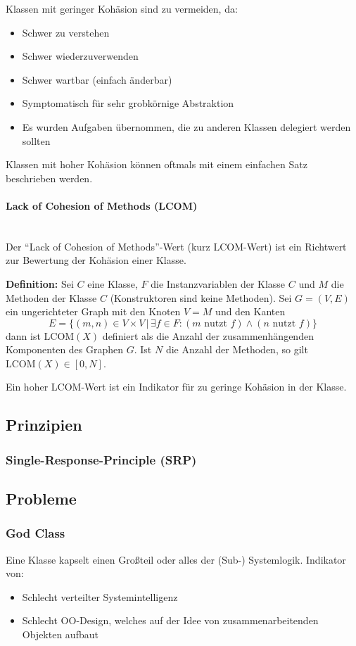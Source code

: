 \documentclass[ngerman]{tuda_summary}
\begin{document}
Klassen mit geringer Kohäsion sind zu vermeiden, da:
\begin{itemize}
    \item Schwer zu verstehen
    \item Schwer wiederzuverwenden
    \item Schwer wartbar (einfach änderbar)
    \item Symptomatisch für sehr grobkörnige Abstraktion
    \item Es wurden Aufgaben übernommen, die zu anderen Klassen delegiert werden sollten
\end{itemize}
Klassen mit hoher Kohäsion können oftmals mit einem einfachen Satz beschrieben werden.

\paragraph{Lack of Cohesion of Methods (LCOM)}\mbox{}\\
Der \enquote{Lack of Cohesion of Methods}-Wert (kurz LCOM-Wert) ist ein Richtwert zur Bewertung der Kohäsion einer Klasse.

\textbf{Definition:} Sei $ C $ eine Klasse, $ F $ die Instanzvariablen der Klasse $ C $ und $ M $ die Methoden der Klasse $ C $ (Konstruktoren sind keine Methoden). Sei $ G = (V, E) $ ein ungerichteter Graph mit den Knoten $ V = M $ und den Kanten \[ E = \{ (m, n) \in V \times V \,|\, \exists f \in F : (m \text{ nutzt } f) \land (n \text{ nutzt } f) \} \] dann ist $ \text{LCOM}(X) $ definiert als die Anzahl der zusammenhängenden Komponenten des Graphen $ G $. Ist $ N $ die Anzahl der Methoden, so gilt $ \text{LCOM}(X) \in [0, N] $.

Ein hoher LCOM-Wert ist ein Indikator für zu geringe Kohäsion in der Klasse.

\subsection{Prinzipien}
\subsubsection{Single-Response-Principle (SRP)}

\subsection{Probleme}
\subsubsection{God Class}
Eine Klasse kapselt einen Großteil oder alles der (Sub-) Systemlogik. Indikator von:
\begin{itemize}
    \item Schlecht verteilter Systemintelligenz
    \item Schlecht OO-Design, welches auf der Idee von zusammenarbeitenden Objekten aufbaut
\end{itemize}
\end{document}
